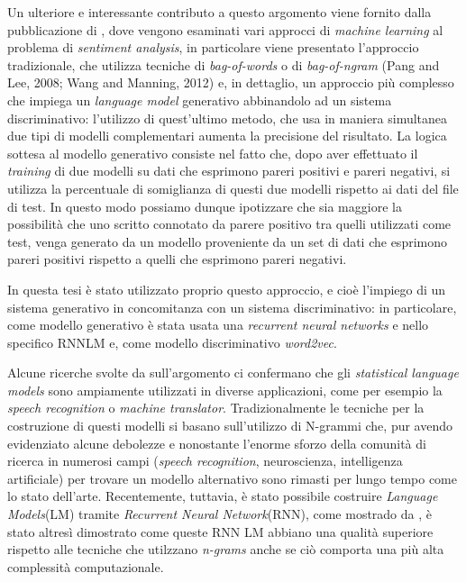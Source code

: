 \documentclass[a4paper,12pt,openright,twoside]{report}
\theoremstyle{definition}
\begin{document}
Un ulteriore e interessante contributo a questo argomento viene fornito 
dalla pubblicazione di \cite{Ens2015}, dove vengono esaminati vari
approcci di \emph{machine learning} al problema di \emph{sentiment analysis},
in particolare viene presentato l'approccio tradizionale, che utilizza tecniche di
\emph{bag-of-words} o di \emph{bag-of-ngram} (Pang and Lee, 2008; Wang and Manning, 2012)
e, in dettaglio, un approccio più complesso che impiega un \emph{language model} generativo
abbinandolo ad un sistema discriminativo: 
l’utilizzo di quest’ultimo metodo, che usa in maniera simultanea due tipi di modelli complementari
aumenta la precisione del risultato.
La logica sottesa al modello generativo consiste nel fatto che, dopo aver effettuato il \emph{training}
di due modelli su dati che esprimono pareri positivi e pareri negativi,
si utilizza la percentuale di somiglianza di questi due modelli rispetto ai dati del file di
test. In questo modo 
possiamo dunque ipotizzare che sia maggiore la possibilità che uno scritto connotato 
da parere positivo tra quelli utilizzati come test, venga generato da un modello proveniente 
da un set di dati che esprimono pareri positivi rispetto a quelli che esprimono pareri negativi.


In questa tesi è stato utilizzato proprio questo approccio, 
e cioè l’impiego di un sistema generativo in concomitanza con un sistema discriminativo:
in particolare, come modello generativo  è stata usata una \emph{recurrent neural networks} 
\- e nello specifico RNNLM \- e, come modello discriminativo \emph{word2vec}.

Alcune ricerche svolte da \cite{Miktesi} sull'argomento ci confermano che 
gli \emph{statistical language models} sono ampiamente utilizzati
in diverse applicazioni, come per esempio la \emph{speech recognition} o \emph{machine translator}.
Tradizionalmente le tecniche per la costruzione di questi modelli si basano sull'utilizzo di 
N-grammi che,
pur avendo evidenziato alcune debolezze e nonostante l'enorme sforzo della
comunità di ricerca in numerosi campi (\emph{speech recognition}, neuroscienza, intelligenza
artificiale) per trovare un modello alternativo sono rimasti per lungo tempo come lo stato dell'arte.
Recentemente, tuttavia, è stato possibile costruire \emph{Language Models}(LM) 
tramite \emph{Recurrent Neural Network}(RNN), come mostrado da \cite{Mik2010,MikEmp},
è stato altresì dimostrato come queste RNN LM abbiano una qualità superiore rispetto alle tecniche
che utilzzano \emph{n-grams} anche se ciò comporta una più alta complessità computazionale.
\end{document}

